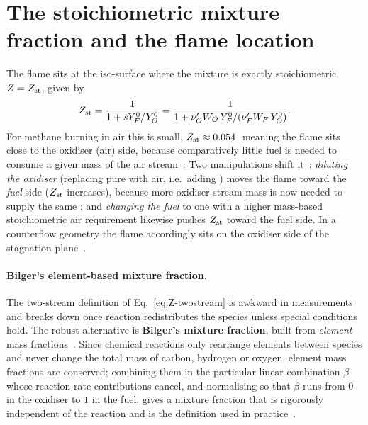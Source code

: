\section{The stoichiometric mixture fraction and the flame location}

The flame sits at the iso-surface where the mixture is exactly stoichiometric, $Z=Z_{\mathrm{st}}$, given by
\begin{equation}
Z_{\mathrm{st}}=\frac{1}{1+sY_F^0/Y_O^0}=\frac{1}{1+\nu_O' W_O\,Y_F^0/(\nu_F' W_F\,Y_O^0)} .
\label{eq:Zst}
\end{equation}
For methane burning in air this is small, $Z_{\mathrm{st}}\approx0.054$, meaning the flame sits close to the oxidiser (air) side, because comparatively little fuel is needed to consume a given mass of the air stream~\cite{transcript_l9}. Two manipulations shift it~\cite{transcript_l9}: \emph{diluting the oxidiser} (replacing pure  with air, i.e.\ adding ) moves the flame toward the \emph{fuel} side ($Z_{\mathrm{st}}$ increases), because more oxidiser-stream mass is now needed to supply the same ; and \emph{changing the fuel} to one with a higher mass-based stoichiometric air requirement likewise pushes $Z_{\mathrm{st}}$ toward the fuel side. In a counterflow geometry the flame accordingly sits on the oxidiser side of the stagnation plane~\cite{transcript_l9}.

\paragraph{Bilger's element-based mixture fraction.}
The two-stream definition of Eq.~\eqref{eq:Z-twostream} is awkward in measurements and breaks down once reaction redistributes the species unless special conditions hold. The robust alternative is \textbf{Bilger's mixture fraction}, built from \emph{element} mass fractions~\cite{lecture9,poinsot2011theoretical}. Since chemical reactions only rearrange elements between species and never change the total mass of carbon, hydrogen or oxygen, element mass fractions are conserved; combining them in the particular linear combination $\beta$ whose reaction-rate contributions cancel, and normalising so that $\beta$ runs from $0$ in the oxidiser to $1$ in the fuel, gives a mixture fraction that is rigorously independent of the reaction and is the definition used in practice~\cite{lecture9,transcript_l9}.

